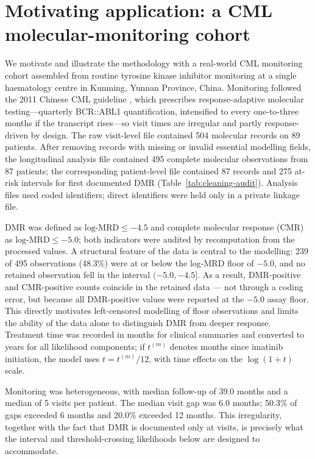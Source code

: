 \documentclass[11pt]{article}
\begin{document}
\section{Motivating application: a CML molecular-monitoring cohort}
\label{sec:motivating}

We motivate and illustrate the methodology with a real-world CML monitoring
cohort assembled from routine tyrosine kinase inhibitor monitoring at a single
haematology centre in Kunming, Yunnan Province, China. Monitoring followed the
2011 Chinese CML guideline \cite{CSH2011CMLGuideline}, which prescribes
response-adaptive molecular testing---quarterly BCR::ABL1 quantification,
intensified to every one-to-three months if the transcript rises---so visit
times are irregular and partly response-driven by design. The raw visit-level
file contained 504 molecular records on 89 patients. After removing records with missing or invalid
essential modelling fields, the longitudinal analysis file contained 495
complete molecular observations from 87 patients; the corresponding
patient-level file contained 87 records and 275 at-risk intervals for
first documented DMR (Table~\ref{tab:cleaning-audit}). Analysis files used coded
identifiers; direct identifiers were held only in a private linkage file.



DMR was defined as $\text{log-MRD}\le-4.5$ and complete molecular response
(CMR) as $\text{log-MRD}\le-5.0$; both indicators were audited by
recomputation from the processed values. A structural feature of the data
is central to the modelling: 239 of 495 observations (48.3\%) were at or
below the log-MRD floor of $-5.0$, and no retained observation fell in the
interval $(-5.0,-4.5]$. As a result, DMR-positive and CMR-positive counts
coincide in the retained data --- not through a coding error, but because
all DMR-positive values were reported at the $-5.0$ assay floor. This
directly motivates left-censored modelling of floor observations and
limits the ability of the data alone to distinguish DMR from deeper
response. Treatment time was recorded in months for clinical summaries and
converted to years for all likelihood components; if $t^{(m)}$ denotes
months since imatinib initiation, the model uses $t=t^{(m)}/12$, with
time effects on the $\log(1+t)$ scale.

Monitoring was heterogeneous, with median follow-up of 39.0 months and a
median of 5 visits per patient. The median visit gap was 6.0 months;
50.3\% of gaps exceeded 6 months and 20.0\% exceeded 12 months. This
irregularity, together with the fact that DMR is documented only at
visits, is precisely what the interval and threshold-crossing likelihoods
below are designed to accommodate.
\end{document}
